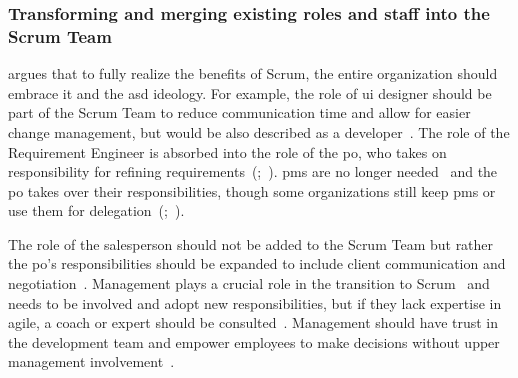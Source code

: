 \subsubsection*{Transforming and merging existing roles and staff into the Scrum Team}\label{subsubsec:TransformingRoles}
 argues that to fully realize the benefits of Scrum, the entire organization should embrace it and the \ac{asd} \gls{ideology}. For example, the role of \ac{ui} designer should be part of the Scrum Team to reduce communication time and allow for easier change management, but would be also described as a \gls{developer}~\cite[p.~214]{Rubin2012ESA}. The role of the Requirement Engineer is absorbed into the role of the \ac{po}, who takes on responsibility for refining requirements~(;~). \Acp{pm} are no longer needed~\cite[p.~239]{Rubin2012ESA} and the \ac{po} takes over their responsibilities, though some organizations still keep \acp{pm} or use them for delegation~(;~).

The role of the salesperson should not be added to the Scrum Team but rather the \ac{po}'s responsibilities should be expanded to include \gls{client} communication and negotiation~\cite[pp.~34--35]{Boehm2005Mct}. Management plays a crucial role in the \gls{transition} to Scrum~\cite[p.~16]{Moreira2013AtA} and needs to be involved and adopt new responsibilities, but if they lack expertise in \gls{agile}, a coach or expert should be consulted~\cite[p.~77]{Moreira2013AtA}. Management should have trust in the development team and empower employees to make decisions without upper management involvement~\cite[p.~34]{Moreira2013AtA}.

